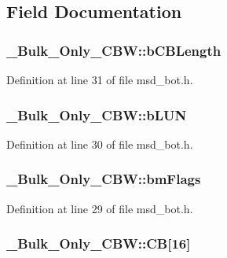 \subsection{Field Documentation}
\hypertarget{struct___bulk___only___c_b_w_adfdf47a10c74aba8a40ee3f1820386e3}{
\subsubsection[{b\-C\-B\-Length}]{ \-\_\-\-Bulk\-\_\-\-Only\-\_\-\-C\-B\-W\-::b\-C\-B\-Length}}\label{struct___bulk___only___c_b_w_adfdf47a10c74aba8a40ee3f1820386e3}


Definition at line 31 of file msd\-\_\-bot.\-h.

\hypertarget{struct___bulk___only___c_b_w_a14bf2d100e3d44cc47e3adb4d6958a1e}{
\subsubsection[{b\-L\-U\-N}]{ \-\_\-\-Bulk\-\_\-\-Only\-\_\-\-C\-B\-W\-::b\-L\-U\-N}}\label{struct___bulk___only___c_b_w_a14bf2d100e3d44cc47e3adb4d6958a1e}


Definition at line 30 of file msd\-\_\-bot.\-h.

\hypertarget{struct___bulk___only___c_b_w_a472a427a009a162ef0286baa121e8f3e}{
\subsubsection[{bm\-Flags}]{ \-\_\-\-Bulk\-\_\-\-Only\-\_\-\-C\-B\-W\-::bm\-Flags}}\label{struct___bulk___only___c_b_w_a472a427a009a162ef0286baa121e8f3e}


Definition at line 29 of file msd\-\_\-bot.\-h.

\hypertarget{struct___bulk___only___c_b_w_a3e245c88e939802dd28d3a5f3dfff8b3}{
\subsubsection[{C\-B}]{ \-\_\-\-Bulk\-\_\-\-Only\-\_\-\-C\-B\-W\-::\-C\-B\mbox{[}16\mbox{]}}}\label{struct___bulk___only___c_b_w_a3e245c88e939802dd28d3a5f3dfff8b3}



